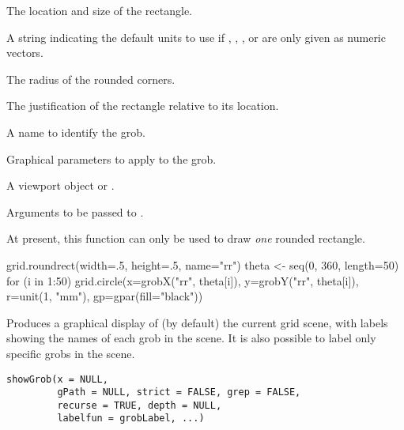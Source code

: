%
\begin{Arguments}
\begin{ldescription}
\item[\code{x, y, width, height}] The location and size of the rectangle.
\item[\code{default.units}] A string indicating the default units to use
if , , , or 
are only given as numeric vectors. 
\item[\code{r}] The radius of the rounded corners.
\item[\code{just}] The justification of the rectangle relative to its
location.
\item[\code{name}] A name to identify the grob.
\item[\code{gp}] Graphical parameters to apply to the grob.
\item[\code{vp}] A viewport object or .
\item[\code{...}] Arguments to be passed to .
\end{ldescription}
\end{Arguments}
%
\begin{Details}\relax
At present, this function can only be used to draw \emph{one}
rounded rectangle.
\end{Details}
%
\begin{Examples}
\begin{ExampleCode}
grid.roundrect(width=.5, height=.5, name="rr")
theta <- seq(0, 360, length=50)
for (i in 1:50) 
    grid.circle(x=grobX("rr", theta[i]),
                y=grobY("rr", theta[i]),
                r=unit(1, "mm"),
                gp=gpar(fill="black"))
\end{ExampleCode}
\end{Examples}
%
\begin{Description}\relax
Produces a graphical display of (by default) the current grid scene,
with labels showing the names of each grob in the scene.
It is also possible to label only specific grobs in the scene.
\end{Description}
%
\begin{Usage}
\begin{verbatim}
showGrob(x = NULL,
         gPath = NULL, strict = FALSE, grep = FALSE,
         recurse = TRUE, depth = NULL,
         labelfun = grobLabel, ...) 
\end{verbatim}
\end{Usage}
%
